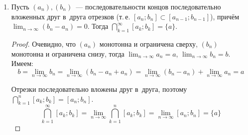 \begin{enumerate}
	\item{} \begin{lemma}
	\label{lemma:about_nested_intervals}
	Пусть $(a_n), (b_n)$~--- последовательности концов последовательно вложенных друг в~друга отрезков (т.\,е. $[a_n; b_n] \subset [a_{n-1}; b_{n-1}]$), причём $\displaystyle \lim_{n \to \infty} (b_n - a_n) = 0$.
	Тогда $\displaystyle \bigcap_{k=1}^\infty [a_k; b_k] = \{ a \}$.
	\end{lemma}
	\begin{proof}
	Очевидно, что $(a_n)$ монотонна и ограничена сверху, $(b_n)$ монотонна и ограничена снизу, тогда $\displaystyle \lim_{n \to \infty} a_n = a$, $\displaystyle \lim_{n \to \infty} b_n = b$.
	Имеем:
	\begin{equation*}
	b = \lim_{n \to \infty} b_n = \lim_{n \to \infty} (b_n - a_n + a_n) = \lim_{n \to \infty} (b_n - a_n) + \lim_{n \to \infty} a_n = a
	\end{equation*}
	
	Отрезки последовательно вложены друг в~друга, поэтому $\displaystyle \bigcap_{k=1}^n [a_k; b_k] = [a_n; b_n]$.
	\begin{equation*}
	\bigcap_{k=1}^\infty [a_k; b_k] = \lim_{n \to \infty} \bigcap_{k=1}^n [a_k; b_k] = \lim_{n \to \infty} [a_n; b_n] = \{ a \}
	\end{equation*}
	\end{proof}
\end{enumerate}